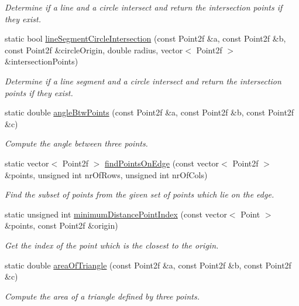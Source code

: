 \begin{DoxyCompactItemize}
\begin{DoxyCompactList}\small\item\em Determine if a line and a circle intersect and return the intersection points if they exist. \end{DoxyCompactList}\item 
static bool \hyperlink{classmultiscale_1_1Geometry2D_a92bd36cdda4cdacb4101c6db54474a6d}{line\-Segment\-Circle\-Intersection} (const Point2f \&a, const Point2f \&b, const Point2f \&circle\-Origin, double radius, vector$<$ Point2f $>$ \&intersection\-Points)
\begin{DoxyCompactList}\small\item\em Determine if a line segment and a circle intersect and return the intersection points if they exist. \end{DoxyCompactList}\item 
static double \hyperlink{classmultiscale_1_1Geometry2D_ace72cd1329667fdb5bc3fc40b96694bd}{angle\-Btw\-Points} (const Point2f \&a, const Point2f \&b, const Point2f \&c)
\begin{DoxyCompactList}\small\item\em Compute the angle between three points. \end{DoxyCompactList}\item 
static vector$<$ Point2f $>$ \hyperlink{classmultiscale_1_1Geometry2D_a9e5c6378463c0e685136d66bfac2a8c1}{find\-Points\-On\-Edge} (const vector$<$ Point2f $>$ \&points, unsigned int nr\-Of\-Rows, unsigned int nr\-Of\-Cols)
\begin{DoxyCompactList}\small\item\em Find the subset of points from the given set of points which lie on the edge. \end{DoxyCompactList}\item 
static unsigned int \hyperlink{classmultiscale_1_1Geometry2D_ae8e5e46c312835e27478ce00b11f8a7c}{minimum\-Distance\-Point\-Index} (const vector$<$ Point $>$ \&points, const Point2f \&origin)
\begin{DoxyCompactList}\small\item\em Get the index of the point which is the closest to the origin. \end{DoxyCompactList}\item 
static double \hyperlink{classmultiscale_1_1Geometry2D_abf0e96a63cf744cab74ab94398e28562}{area\-Of\-Triangle} (const Point2f \&a, const Point2f \&b, const Point2f \&c)
\begin{DoxyCompactList}\small\item\em Compute the area of a triangle defined by three points. \end{DoxyCompactList}\item 

\end{DoxyCompactItemize}
